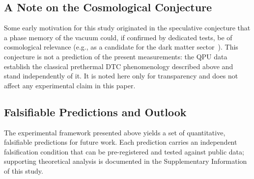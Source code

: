 \documentclass[12pt,a4paper]{article}
\begin{document}
\subsection{A Note on the Cosmological Conjecture}

Some early motivation for this study originated in the speculative conjecture that a phase memory of the vacuum could, if confirmed by dedicated tests, be of cosmological relevance (e.g., as a candidate for the dark matter sector~\cite{planck2018,wheeler1957,penrose1996}). This conjecture is not a prediction of the present measurements: the QPU data establish the classical prethermal DTC phenomenology described above and stand independently of it. It is noted here only for transparency and does not affect any experimental claim in this paper.

\subsection{Falsifiable Predictions and Outlook}

The experimental framework presented above yields a set of quantitative, falsifiable predictions for future work. Each prediction carries an independent falsification condition that can be pre-registered and tested against public data; supporting theoretical analysis is documented in the Supplementary Information of this study.
\end{document}
